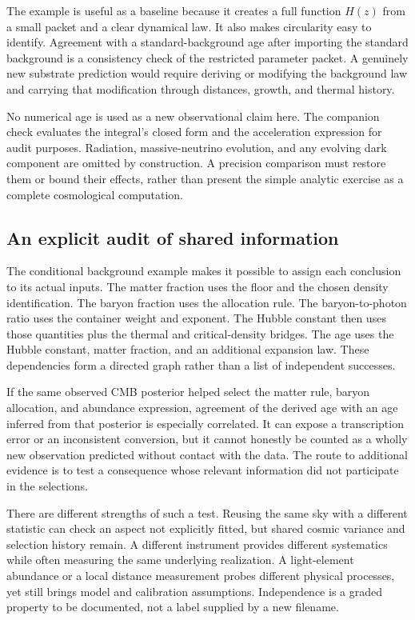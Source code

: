 The example is useful as a baseline because it creates a full function $H(z)$ from a small packet and a clear dynamical law. It also makes circularity easy to identify. Agreement with a standard-background age after importing the standard background is a consistency check of the restricted parameter packet. A genuinely new substrate prediction would require deriving or modifying the background law and carrying that modification through distances, growth, and thermal history.

No numerical age is used as a new observational claim here. The companion check evaluates the integral's closed form and the acceleration expression for audit purposes. Radiation, massive-neutrino evolution, and any evolving dark component are omitted by construction. A precision comparison must restore them or bound their effects, rather than present the simple analytic exercise as a complete cosmological computation.

\subsection{An explicit audit of shared information}
The conditional background example makes it possible to assign each conclusion to its actual inputs. The matter fraction uses the floor and the chosen density identification. The baryon fraction uses the allocation rule. The baryon-to-photon ratio uses the container weight and exponent. The Hubble constant then uses those quantities plus the thermal and critical-density bridges. The age uses the Hubble constant, matter fraction, and an additional expansion law. These dependencies form a directed graph rather than a list of independent successes.

If the same observed CMB posterior helped select the matter rule, baryon allocation, and abundance expression, agreement of the derived age with an age inferred from that posterior is especially correlated. It can expose a transcription error or an inconsistent conversion, but it cannot honestly be counted as a wholly new observation predicted without contact with the data. The route to additional evidence is to test a consequence whose relevant information did not participate in the selections.

There are different strengths of such a test. Reusing the same sky with a different statistic can check an aspect not explicitly fitted, but shared cosmic variance and selection history remain. A different instrument provides different systematics while often measuring the same underlying realization. A light-element abundance or a local distance measurement probes different physical processes, yet still brings model and calibration assumptions. Independence is a graded property to be documented, not a label supplied by a new filename.

